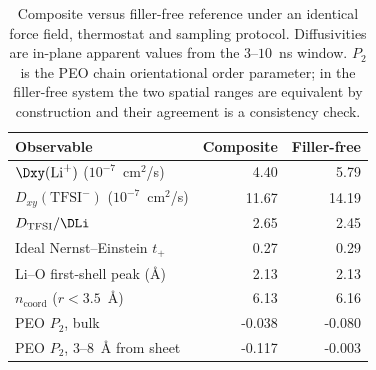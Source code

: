 \begin{table}[htbp]
\caption{Composite versus filler-free reference under an identical force
field, thermostat and sampling protocol. Diffusivities are in-plane
apparent values from the $3$--$10$~ns window. $P_2$ is the PEO chain
orientational order parameter; in the filler-free system the two spatial
ranges are equivalent by construction and their agreement is a
consistency check.}
\label{tab:control}
\centering
\begin{tabular}{lrr}
\hline
Observable & Composite & Filler-free \\
\hline
$\Dxy(\mathrm{Li}^+)$ ($10^{-7}$~cm$^2$/s) & 4.40 & 5.79 \\
$D_{xy}(\mathrm{TFSI}^-)$ ($10^{-7}$~cm$^2$/s) & 11.67 & 14.19 \\
$D_{\mathrm{TFSI}}/\DLi$ & 2.65 & 2.45 \\
Ideal Nernst--Einstein $t_+$ & 0.27 & 0.29 \\
Li--O first-shell peak (\AA) & 2.13 & 2.13 \\
$n_{\mathrm{coord}}$ ($r<3.5$~\AA) & 6.13 & 6.16 \\
PEO $P_2$, bulk & -0.038 & -0.080 \\
PEO $P_2$, $3$--$8$~\AA{} from sheet & -0.117 & -0.003 \\
\hline
\end{tabular}
\end{table}

